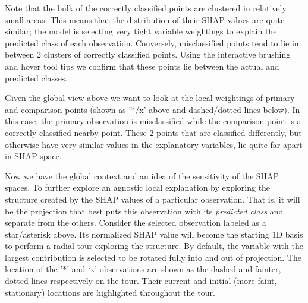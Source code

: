 \documentclass[
  11,
]{article}
\begin{document}
Note that the bulk of the correctly classified points are clustered in relatively small areas. This means that the distribution of their SHAP values are quite similar; the model is selecting very tight variable weightings to explain the predicted class of each observation. Conversely, misclassified points tend to lie in between 2 clusters of correctly classified points. Using the interactive brushing and hover tool tips we confirm that these points lie between the actual and predicted classes.

Given the global view above we want to look at the local weightings of primary and comparison points (shown as '*/x' above and dashed/dotted lines below). In this case, the primary observation is misclassified while the comparison point is a correctly classified nearby point. These 2 points that are classified differently, but otherwise have very similar values in the explanatory variables, lie quite far apart in SHAP space.

Now we have the global context and an idea of the sensitivity of the SHAP spaces. To further explore an agnostic local explanation by exploring the structure created by the SHAP values of a particular observation. That is, it will be the projection that best puts this observation with its \emph{predicted class} and separate from the others. Consider the selected observation labeled as a star/asterisk above. Its normalized SHAP value will become the starting 1D basis to perform a radial tour exploring the structure. By default, the variable with the largest contribution is selected to be rotated fully into and out of projection. The location of the '*' and `x' observations are shown as the dashed and fainter, dotted lines respectively on the tour. Their current and initial (more faint, stationary) locations are highlighted throughout the tour.
\end{document}
